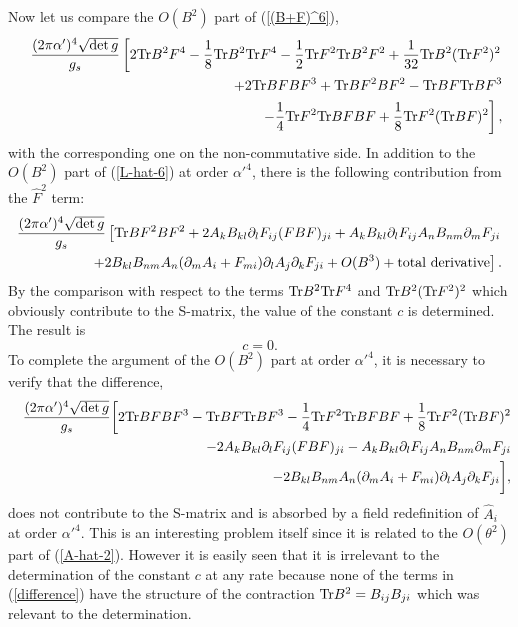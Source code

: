 \documentclass[a4paper,12pt]{article}
\begin{document}
Now let us compare the $O(B^2)$ part of (\ref{(B+F)^6}),
\begin{eqnarray}
&& \frac{(2 \pi \alpha')^4 \sqrt{\det g}}{g_s} \left[
2 {\rm Tr} B^2 F^4
- \frac{1}{8} {\rm Tr} B^2 {\rm Tr} F^4
- \frac{1}{2} {\rm Tr} F^2 {\rm Tr} B^2 F^2
+ \frac{1}{32} {\rm Tr} B^2 ( {\rm Tr} F^2 )^2
\right. \nonumber \\ && \qquad \qquad \qquad \qquad
+ 2 {\rm Tr} B F B F^3
+ {\rm Tr}  B F^2 B F^2
- {\rm Tr} B F {\rm Tr} B F^3
\nonumber \\ && \qquad \qquad \qquad \qquad \left.
- \frac{1}{4} {\rm Tr} F^2 {\rm Tr} B F B F
+ \frac{1}{8} {\rm Tr} F^2 ( {\rm Tr} B F )^2
\right],
\label{B^2-in-(B+F)^6}
\end{eqnarray}
with the corresponding one on the non-commutative side.
In addition to the $O(B^2)$ part of (\ref{L-hat-6})
at order $\alpha'^4$,
there is the following contribution from the $\hat{F}^2$ term:
\begin{eqnarray}
\frac{(2 \pi \alpha')^4 \sqrt{\det g}}{g_s}
\left[
{\rm Tr} B F^2 B F^2 + 2 A_k B_{kl} \partial_l F_{ij} (FBF)_{ji}
+ A_k B_{kl} \partial_l F_{ij} A_n B_{nm} \partial_m F_{ji}
\right. \nonumber \\ \left.
+ 2 B_{kl} B_{nm} A_n ( \partial_m A_i + F_{mi} )
\partial_l A_j \partial_k F_{ji}
+ O(B^3) + {\rm total~derivative}
\right].
\end{eqnarray}
By the comparison with respect to
the terms ${\rm Tr} B^2 {\rm Tr} F^4$
and ${\rm Tr} B^2 ( {\rm Tr} F^2 )^2$
which obviously contribute to the S-matrix,
the value of the constant $c$ is determined.
The result is
\begin{equation}
c=0.
\end{equation}
To complete the argument of the $O(B^2)$ part
at order $\alpha'^4$,
it is necessary to verify that the difference,
\begin{eqnarray}
&& \frac{(2 \pi \alpha')^4 \sqrt{\det g}}{g_s} \biggl[
2 {\rm Tr} B F B F^3
- {\rm Tr} B F {\rm Tr} B F^3
- \frac{1}{4} {\rm Tr} F^2 {\rm Tr} B F B F
+ \frac{1}{8} {\rm Tr} F^2 ( {\rm Tr} B F )^2
\nonumber \\
&& \qquad \qquad \qquad \quad
- 2 A_k B_{kl} \partial_l F_{ij} (FBF)_{ji}
- A_k B_{kl} \partial_l F_{ij} A_n B_{nm} \partial_m F_{ji}
\nonumber \\
&& \qquad \qquad \qquad \quad
- 2 B_{kl} B_{nm} A_n ( \partial_m A_i + F_{mi} )
\partial_l A_j \partial_k F_{ji}
\biggr],
\label{difference}
\end{eqnarray}
does not contribute to the S-matrix and is absorbed
by a field redefinition of $\hat{A}_i$ at order $\alpha'^4$.
This is an interesting problem itself
since it is related to the $O(\theta^2)$ part
of (\ref{A-hat-2}).
However it is easily seen that
it is irrelevant to the determination
of the constant $c$ at any rate
because none of the terms in (\ref{difference})
have the structure of the contraction
${\rm Tr} B^2 = B_{ij} B_{ji}$ which was relevant
to the determination.
\end{document}
